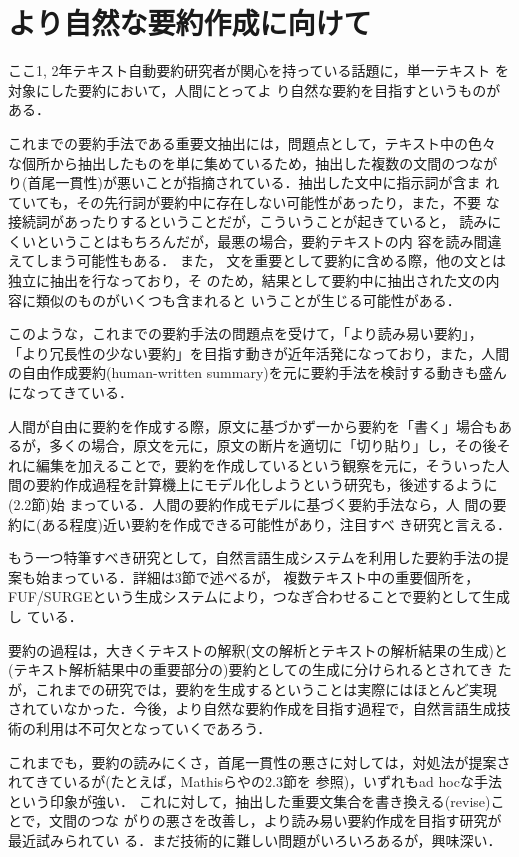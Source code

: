 \section{より自然な要約作成に向けて}

ここ1, 2年テキスト自動要約研究者が関心を持っている話題に，単一テキスト
を対象にした要約において，人間にとってよ
り自然な要約を目指すというものがある．

これまでの要約手法である重要文抽出には，問題点として，テキスト中の色々
な個所から抽出したものを単に集めているため，抽出した複数の文間のつなが
り(首尾一貫性)が悪いことが指摘されている．抽出した文中に指示詞が含ま
れていても，その先行詞が要約中に存在しない可能性があったり，また，不要
な接続詞があったりするということだが，こういうことが起きていると，
読みにくいということはもちろんだが，最悪の場合，要約テキストの内
容を読み間違えてしまう可能性もある．
また，
文を重要として要約に含める際，他の文とは独立に抽出を行なっており，そ
のため，結果として要約中に抽出された文の内容に類似のものがいくつも含まれると
いうことが生じる可能性がある．

このような，これまでの要約手法の問題点を受けて，「より読み易い要約」，
「より冗長性の少ない要約」を目指す動きが近年活発になっており，また，人間
の自由作成要約(human-written summary)を元に要約手法を検討する動きも盛ん
になってきている．

人間が自由に要約を作成する際，原文に基づかず一から要約を「書く」場合もあ
るが，多くの場合，原文を元に，原文の断片を適切に「切り貼り」し，その後そ
れに編集を加えることで，要約を作成しているという観察を元に，そういった人
間の要約作成過程を計算機上にモデル化しようという研究も，後述するように
(2.2節)始
まっている\cite{jing:00:b}．人間の要約作成モデルに基づく要約手法なら，人
間の要約に(ある程度)近い要約を作成できる可能性があり，注目すべ
き研究と言える．

もう一つ特筆すべき研究として，自然言語生成システムを利用した要約手法の提
案も始まっている\cite{mckeown:99:a,barzilay:99:a}．詳細は3節で述べるが，
複数テキスト中の重要個所を，
FUF/SURGEという生成システムにより，つなぎ合わせることで要約として生成し
ている．

要約の過程は，大きくテキストの解釈(文の解析とテキストの解析結果の生成)と
(テキスト解析結果中の重要部分の)要約としての生成に分けられるとされてき
たが，これまでの研究では，要約を生成するということは実際にはほとんど実現
されていなかった．今後，より自然な要約作成を目指す過程で，自然言語生成技
術の利用は不可欠となっていくであろう．

これまでも，要約の読みにくさ，首尾一貫性の悪さに対しては，対処法が提案さ
れてきているが(たとえば，Mathisら\cite{mathis:73:a}や\cite{okumura:99:a}の2.3節を
参照)，いずれもad hocな手法という印象が強い．
これに対して，抽出した重要文集合を書き換える(revise)ことで，文間のつな
がりの悪さを改善し，より読み易い要約作成を目指す研究が最近試みられてい
る\cite{nanba:99:b}．まだ技術的に難しい問題がいろいろあるが，興味深い．

